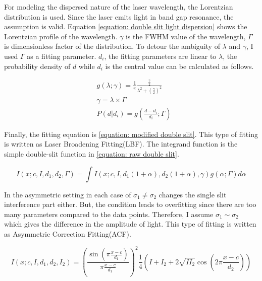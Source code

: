 \documentclass{article}
\begin{document}
 For modeling the dispersed nature of the laser wavelength, the Lorentzian distribution is used.
 Since the laser emits light in band gap resonance, the assumption is valid.
 Equation \ref{equation: double slit light dispersion} shows the Lorentzian profile of the wavelength.
 $\gamma$ is the FWHM value of the wavelength, $\Gamma$ is dimensionless factor of the distribution.
 To detour the ambiguity of $\lambda$ and $\gamma$, I used $\Gamma$ as a fitting parameter.
 $d_i$, the fitting parameters are linear to $\lambda$, the probability density of $d$ while $d_i$ is the central value can be calculated as follows.

 \begin{align}
    &g(\lambda; \gamma) = \frac{1}{\pi} \frac{\frac{\gamma}{2}}{\lambda^2 + (\frac{\gamma}{2})^2} \nonumber \\
    &\gamma = \lambda \times \Gamma \nonumber \\
    &P(d|d_i) = g(\frac{d-d_i}{d_i};\Gamma) \label{equation: double slit light dispersion}
 \end{align}
 
 Finally, the fitting equation is \ref{equation: modified double slit}.
 This type of fitting is written as Laser Broadening Fitting(LBF).
 The integrand function is the simple double-slit function in \ref{equation: raw double slit}.

 \begin{equation}
    I(x;c,I,d_1,d_2,\Gamma) = \int I(x;c,I,d_1(1+\alpha),d_2(1+\alpha),\gamma) g(\alpha;\Gamma) d\alpha
    \label{equation: modified double slit}
 \end{equation}

 In the asymmetric setting in each case of $\sigma_1 \neq \sigma_2$ changes the single slit interference part either.
 But, the condition leads to overfitting since there are too many parameters compared to the data points.
 Therefore, I assume $\sigma_1 \sim \sigma_2$ which gives the difference in the amplitude of light.
 This type of fitting is written as Asymmetric Correction Fitting(ACF).

 \begin{equation}
    I(x;c,I,d_1,d_2, I_2) = \left( \frac{\sin(\pi \frac{x-c}{d_1})}{\pi \frac{x-c}{d_1}} \right)^2 \frac{1}{4}(I + I_2 + 2 \sqrt{I I_2}\cos(2\pi \frac{x-c}{d_2})) 
 \end{equation}
 
\end{document}
